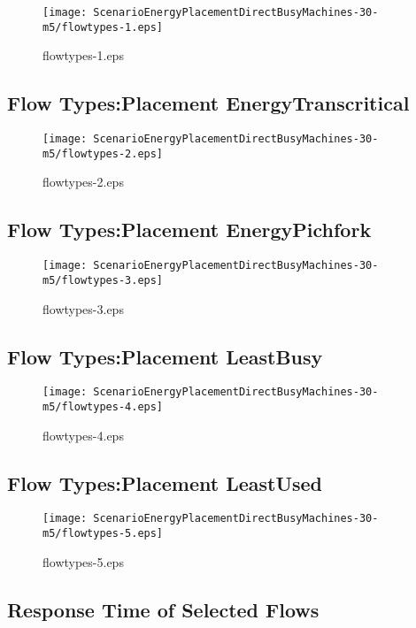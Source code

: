 \documentclass{elsart}
\begin{document}
\begin{figure}[ht]
\centering
\texttt{[image: ScenarioEnergyPlacementDirectBusyMachines-30-m5/flowtypes-1.eps]}
\caption{flowtypes-1.eps}\label{fig:flowtypes-1}
\end{figure}

\clearpage
\subsection{Flow Types:Placement EnergyTranscritical}

\begin{figure}[ht]
\centering
\texttt{[image: ScenarioEnergyPlacementDirectBusyMachines-30-m5/flowtypes-2.eps]}
\caption{flowtypes-2.eps}\label{fig:flowtypes-2}
\end{figure}

\clearpage
\subsection{Flow Types:Placement EnergyPichfork}

\begin{figure}[ht]
\centering
\texttt{[image: ScenarioEnergyPlacementDirectBusyMachines-30-m5/flowtypes-3.eps]}
\caption{flowtypes-3.eps}\label{fig:flowtypes-3}
\end{figure}

\clearpage
\subsection{Flow Types:Placement LeastBusy}

\begin{figure}[ht]
\centering
\texttt{[image: ScenarioEnergyPlacementDirectBusyMachines-30-m5/flowtypes-4.eps]}
\caption{flowtypes-4.eps}\label{fig:flowtypes-4}
\end{figure}

\clearpage
\subsection{Flow Types:Placement LeastUsed}

\begin{figure}[ht]
\centering
\texttt{[image: ScenarioEnergyPlacementDirectBusyMachines-30-m5/flowtypes-5.eps]}
\caption{flowtypes-5.eps}\label{fig:flowtypes-5}
\end{figure}

\clearpage
\subsection{Response Time of Selected Flows}
\end{document}
